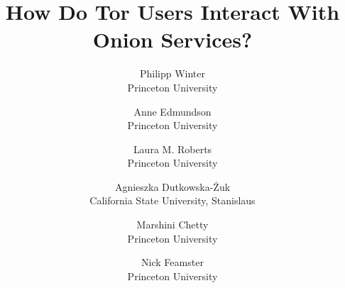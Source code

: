 \documentclass[letterpaper,twocolumn,10pt]{article}
\begin{document}
\date{}

\title{
    {\Large \textbf{How Do Tor Users Interact With Onion Services?}}
}

\author{
	{\rm Philipp Winter} \\
	Princeton University
	\and
	{\rm Anne Edmundson} \\
	Princeton University
	\and
	{\rm Laura M. Roberts} \\
	Princeton University
	\and
	{\rm Agnieszka Dutkowska-Żuk} \\
	California State University, Stanislaus
	\and
	{\rm Marshini Chetty} \\
	Princeton University
	\and
	{\rm Nick Feamster} \\
	Princeton University
}

\maketitle

\thispagestyle{empty}



















{\footnotesize
\printbibliography}


\end{document}
